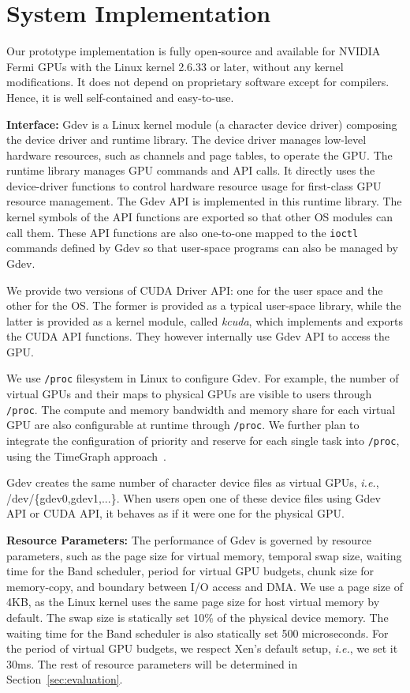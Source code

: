 \vspace{-0.25em}
\section{System Implementation}
\label{sec:implementation}
\vspace{-0.25em}

Our prototype implementation is fully open-source and available for
NVIDIA Fermi GPUs with the Linux kernel 2.6.33 or later, without any
kernel modifications.
It does not depend on proprietary software except for compilers.
Hence, it is well self-contained and easy-to-use.

\textbf{Interface:}
Gdev is a Linux kernel module (a character device driver) composing the
device driver and runtime library.
The device driver manages low-level hardware resources, such as channels
and page tables, to operate the GPU.
The runtime library manages GPU commands and API calls.
It directly uses the device-driver functions to control hardware
resource usage for first-class GPU resource management.
The Gdev API is implemented in this runtime library.
The kernel symbols of the API functions are exported so that other OS
modules can call them.
These API functions are also one-to-one mapped to the \texttt{ioctl}
commands defined by Gdev so that user-space programs can also be managed
by Gdev.

We provide two versions of CUDA Driver API: one for the user space and
the other for the OS.
The former is provided as a typical user-space library, while the
latter is provided as a kernel module, called \textit{kcuda},
which implements and exports the CUDA API functions.
They however internally use Gdev API to access the GPU.

We use \texttt{/proc} filesystem in Linux to configure Gdev.
For example, the number of virtual GPUs and their maps to physical GPUs
are visible to users through \texttt{/proc}.
The compute and memory bandwidth and memory share for each virtual GPU
are also configurable at runtime through \texttt{/proc}.
We further plan to integrate the configuration of priority and
reserve for each single task into \texttt{/proc}, using the TimeGraph
approach~\cite{Kato_ATC11}.

Gdev creates the same number of character device files as virtual GPUs,
\textit{i.e.}, /dev/\{gdev0,gdev1,...\}.
When users open one of these device files using Gdev API or CUDA API,
it behaves as if it were one for the physical GPU.

\textbf{Resource Parameters:}
The performance of Gdev is governed by resource parameters, such as the
page size for virtual memory, temporal swap size, waiting time for the
Band scheduler, period for virtual GPU budgets, chunk size
for memory-copy, and boundary between I/O access and DMA.
We use a page size of 4KB, as the Linux kernel uses the same page size
for host virtual memory by default.
The swap size is statically set 10\% of the physical device memory.
The waiting time for the Band scheduler is also statically set 500
microseconds.
For the period of virtual GPU budgets, we respect Xen's default setup,
\textit{i.e.}, we set it 30ms.
The rest of resource parameters will be determined in
Section~\ref{sec:evaluation}.

